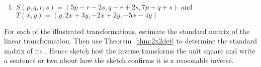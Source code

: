 \begin{exercise}
\begin{enumerate}
\item \(S(p,q,r,s)=(5p-r-2s, q-r+2s, 7p+q+s)\) and \(T(x,y)=(y, 2x+3y, -2x+2y, -5x-4y)\)

\end{enumerate}
\end{exercise}






\begin{exercise} \label{ex:} 
For each of the illustrated transformations, estimate the standard matrix of the linear transformation. 
Then use Theorem~\ref{thm:2x2det} to determine the standard matrix of its .
Hence sketch how the inverse transforms the unit square and write a sentence or two about how the sketch confirms it is a reasonable inverse. 
\begin{parts}
\item {}
\item {}
\item {}
\item {}
\item {}
\end{parts}
\end{exercise}






\begin{comment}%
why, what caused X?
how did X occur?
what-if? what-if-not?
how does X compare with Y?
what is the evidence for X?
why is X important?
\end{comment}

